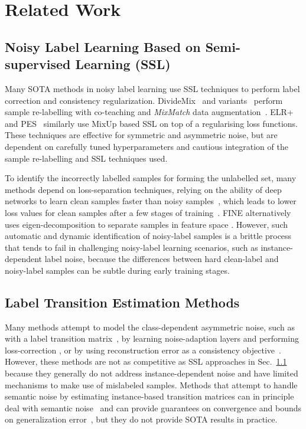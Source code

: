 \documentclass[10pt,twocolumn,letterpaper]{article}
\begin{document}
\section{Related Work}

\subsection{Noisy Label Learning Based on Semi-supervised Learning (SSL)}
\label{sec:related_work_SSL}

Many SOTA methods in noisy label learning use SSL techniques to perform label correction and consistency regularization. DivideMix~\cite{li2020dividemix} and variants~\cite{sachdeva2021scanmix, cordeiro2021propmix, zheltonozhskii2022contrast} perform sample re-labelling with co-teaching and \textit{MixMatch} data augmentation~\cite{berthelot2019mixmatch}. 
ELR+~\cite{liu2020early} and PES~\cite{bai2021understanding} similarly use MixUp \cite{zhang2018mixup} based SSL on top of a regularising loss functions. 
These techniques are effective for symmetric and asymmetric noise, but are dependent on carefully tuned hyperparameters 
and cautious integration of the sample re-labelling and SSL techniques used.

To identify the incorrectly labelled samples for forming the unlabelled set, many methods depend on loss-separation techniques, relying on the ability of deep networks to learn clean samples faster than noisy samples~\cite{arpit2017closer}, which leads to lower loss values for clean samples after a few stages of  training~\cite{han2018co, chen2019understanding, arazo2019unsupervised, li2020dividemix, xu2021faster}. FINE alternatively uses eigen-decomposition to separate samples in feature space \cite{kim2021fine}.  
However, such automatic and dynamic identification of noisy-label samples is a brittle process that tends to fail in challenging noisy-label learning scenarios, such as instance-dependent label noise, because the differences between hard clean-label and noisy-label samples can be subtle during early training stages.

\subsection{Label Transition Estimation Methods}

Many methods attempt to model the class-dependent asymmetric noise, such as with a label transition matrix~\cite{xia2019anchor}, by learning
noise-adaption layers and performing loss-correction \cite{Goldberger2017TrainingDN, patrini2017making},
or by using reconstruction error as a consistency objective~\cite{reed2014training}. However, these methods are not as  competitive as SSL approaches in Sec.~\ref{sec:related_work_SSL} because they generally do not address instance-dependent noise and have 
limited mechanisms to make use of mislabeled samples.
Methods that attempt to handle semantic noise by estimating instance-based transition matrices can in principle deal with semantic noise~\cite{Goldberger2017TrainingDN} and can provide guarantees on convergence and bounds on generalization error~\cite{zhang2021learning}, but they do not provide SOTA results in practice.
\end{document}

